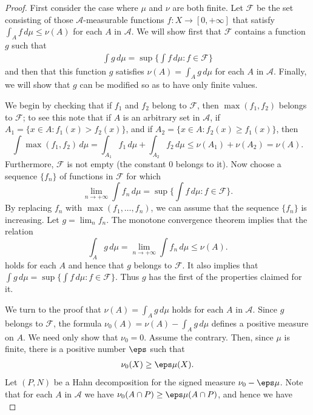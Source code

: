 \begin{proof}
First consider the case where $\mu$ and $\nu$ are both finite. Let $\mathscr{F}$ be the set consisting of those $\mathcal{A}$-measurable functions $f:X\to[0,+\infty]$ that satisfy $\int_Af\,dμ\leq\nu(A)$ for each $A$ in $\mathcal{A}$. We will show first that $\mathscr{F}$ contains a function $g$ such that
\begin{align}\label{Radon-Nikodym positive-1}
\int g\,d\mu=\sup\Big\{\int f\,d\mu:f\in\mathscr{F}\Big\}
\end{align}
and then that this function $g$ satisfies $\nu(A)=\int_Ag\,d\mu$ for each $A$ in $\mathcal{A}$. Finally, we will show that $g$ can be modified so as to have only finite values.\par
We begin by checking that if $f_1$ and $f_2$ belong to $\mathscr{F}$, then $\max(f_1,f_2)$ belongs to $\mathscr{F}$; to see this note that if $A$ is an arbitrary set in $\mathcal{A}$, if $A_1=\{x\in A:f_1(x)>f_2(x)\}$, and
if $A_2=\{x\in A:f_2(x)\geq f_1(x)\}$, then
\[\int\max(f_1,f_2)\,d\mu=\int_{A_1}f_1\,d\mu+\int_{A_2}f_2\,d\mu\leq\nu(A_1)+\nu(A_2)=\nu(A).\]
Furthermore, $\mathscr{F}$ is not empty (the constant $0$ belongs to it). Now choose a sequence $\{f_n\}$ of functions in $\mathscr{F}$ for which
\[\lim_{n\to+\infty}\int f_n\,d\mu=\sup\Big\{\int f\,d\mu:f\in\mathscr{F}\Big\}.\]
By replacing $f_n$ with $\max(f_1,\dots,f_n)$, we can assume that the sequence $\{f_n\}$ is increasing. Let $g=\lim_nf_n$. The monotone convergence theorem implies that the relation
\[\int_Ag\,d\mu=\lim_{n\to+\infty}\int f_n\,d\mu\leq\nu(A).\]
holds for each $A$ and hence that $g$ belongs to $\mathscr{F}$. It also implies that $\int g\,d\mu=\sup\{\int f\,d\mu:f\in\mathscr{F}\}$. Thus $g$ has the first of the properties claimed for it.\par
We turn to the proof that $\nu(A)=\int_Ag\,d\mu$ holds for each $A$ in $\mathcal{A}$. Since $g$ belongs to $\mathscr{F}$, the formula $\nu_0(A)=\nu(A)-\int_Ag\,d\mu$ defines a positive measure on $A$. We need only show that $\nu_0=0$. Assume the contrary. Then, since $\mu$ is finite, there is a positive number $\eps$ such that
\begin{align}\label{Radon-Nikodym positive-2}
\nu_0(X)\geq\eps\mu(X).
\end{align}
Let $(P,N)$ be a Hahn decomposition for the signed measure $\nu_0-\eps\mu$. Note that for each $A$ in $\mathcal{A}$ we have $\nu_0(A\cap P)\geq\eps\mu(A\cap P)$, and hence we have
\begin{equation}\label{Radon-Nikodym positive-3}

\end{equation}
\end{proof}
